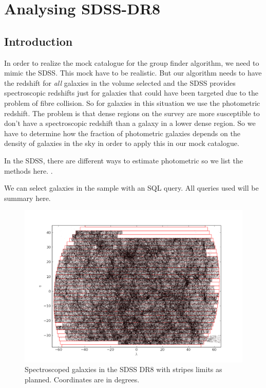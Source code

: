 \chapter{Analysing SDSS-DR8\label{ap:sdss}}
%
\section{Introduction}
%
In order to realize the mock catalogue for the group finder algorithm, we need
to mimic the SDSS\@. This mock have to be realistic. But our algorithm needs to
have the redshift for \emph{all} galaxies in the volume selected and the SDSS
provides spectroscopic redshifts just for galaxies that could have been
targeted due to the problem of fibre collision. So for galaxies in this
situation we use the photometric redshift. The problem is that dense regions on
the survey are more susceptible to don't have a spectroscopic redshift than a
galaxy in a lower dense region. So we have to determine how the fraction of
photometric galaxies depends on the density of galaxies in the sky in order to
apply this in our mock catalogue.

In the SDSS, there are different ways to estimate photometric so we list the
methods here. .

We can select galaxies in the sample with an SQL query. All queries used will
be summary here.
%
\begin{figure}
    \centering
    \includegraphics[width=\linewidth]{figures/sdss/SpectroGalStripesSDSSoriginal.png}
    \caption{Spectroscoped galaxies in the SDSS DR8 with stripes limits as
    planned. Coordinates are in degrees.}
\label{fig:SDSSspecgalstripes}
\end{figure}
%
